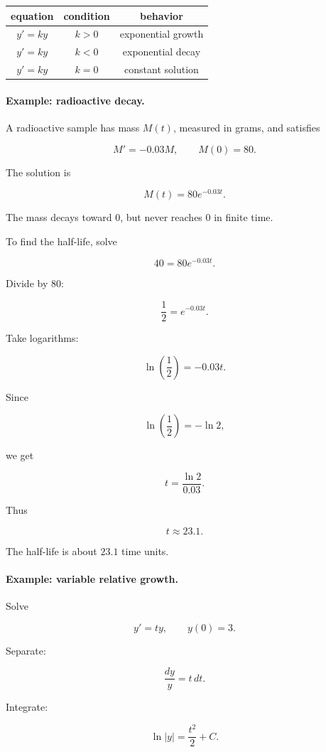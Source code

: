 \begin{center}
\begin{tabular}{c|c|c}
\textbf{equation} & \textbf{condition} & \textbf{behavior} \\ \hline
\(y'=ky\) & \(k>0\) & exponential growth \\
\(y'=ky\) & \(k<0\) & exponential decay \\
\(y'=ky\) & \(k=0\) & constant solution
\end{tabular}
\end{center}

\paragraph{Example: radioactive decay.}
A radioactive sample has mass \(M(t)\), measured in grams, and satisfies

\[
M'=-0.03M,
\qquad
M(0)=80.
\]

The solution is

\[
M(t)=80e^{-0.03t}.
\]

The mass decays toward \(0\), but never reaches \(0\) in finite time.

To find the half-life, solve

\[
40=80e^{-0.03t}.
\]

Divide by \(80\):

\[
\frac12=e^{-0.03t}.
\]

Take logarithms:

\[
\ln\left(\frac12\right)=-0.03t.
\]

Since

\[
\ln\left(\frac12\right)=-\ln2,
\]

we get

\[
t=\frac{\ln2}{0.03}.
\]

Thus

\[
\boxed{
t\approx23.1.
}
\]

The half-life is about \(23.1\) time units.

\paragraph{Example: variable relative growth.}
Solve

\[
y'=ty,
\qquad
y(0)=3.
\]

Separate:

\[
\frac{dy}{y}=t\,dt.
\]

Integrate:

\[
\ln|y|=\frac{t^2}{2}+C.
\]

